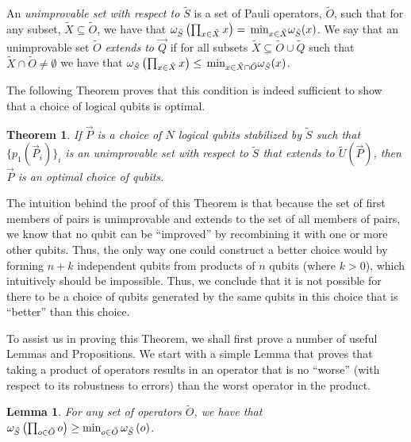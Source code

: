 \documentclass[twocolumn,showpacs,preprintnumbers,amsmath,amssymb,nofootinbib,pra,floatfix]{revtex4-1}
\newtheorem{theorem}{Theorem}
\newtheorem{lemma}{Lemma}
\newenvironment{definition}[1][Definition]{\begin{trivlist}
\item[\hskip \labelsep {\bfseries #1}]}{\end{trivlist}}
\newenvironment{remark}[1][Remark]{\begin{trivlist}
\item[\hskip \labelsep {\bfseries #1}]}{\end{trivlist}}
\newcommand{\lst}{\vec}
\newcommand{\set}{\tilde}
\begin{document}
\begin{definition}
An \emph{unimprovable set with respect to $\set S$} is a set of Pauli operators, $\set O$, such that for any subset, $\set X\subseteq \set O$, we have that $\om_{\set S}\paren{\prod_{x\in \set X} x} = \min_{x\in\set X}\om_{\set S}(x)$.  We say that an unimprovable set $\set O$ \emph{extends to $\lst Q$} if for all subsets $\set X \subseteq \set O\cup\set Q$ such that $\set X\cap \set O \ne \emptyset$ we have that $\om_{\set S}\paren{\prod_{x\in \set X} x} \le \min_{x\in\set X\cap \set O}\om_{\set S}(x)$.
\end{definition}
The following Theorem proves that this condition is indeed sufficient to show that a choice of logical qubits is optimal.
\begin{theorem}
\label{optimality-condition}
If $\lst P$ is a choice of $N$ logical qubits stabilized by $\set S$ such that $\{p_1(\lst P_i)\}_i$ is an unimprovable set with respect to $\set S$ that extends to $\set U(\lst P)$, then $\lst P$ is an optimal choice of qubits.
\end{theorem}

\begin{remark}
The intuition behind the proof of this Theorem is that because the set of first members of pairs is unimprovable and extends to the set of all members of pairs, we know that no qubit can be ``improved'' by recombining it with one or more other qubits.  Thus, the only way one could construct a better choice would by forming $n+k$ independent qubits from products of $n$ qubits (where $k>0$), which intuitively should be impossible.  Thus, we conclude that it is not possible for there to be a choice of qubits generated by the same qubits in this choice that is ``better'' than this choice.

To assist us in proving this Theorem, we shall first prove a number of useful Lemmas and Propositions.  We start with a simple Lemma that proves that taking a product of operators results in an operator that is no ``worse'' (with respect to its robustness to errors) than the worst operator in the product.
\end{remark}
\begin{lemma}
\label{combinations-can't-make-things-worse}
For any set of operators $\set O$, we have that $\om_{\set S}\paren{\prod_{o\in\set O} o} \ge \text{min}_{o\in \set O}\,\om_{\set S}\paren{o}$.
\end{lemma}
\end{document}
